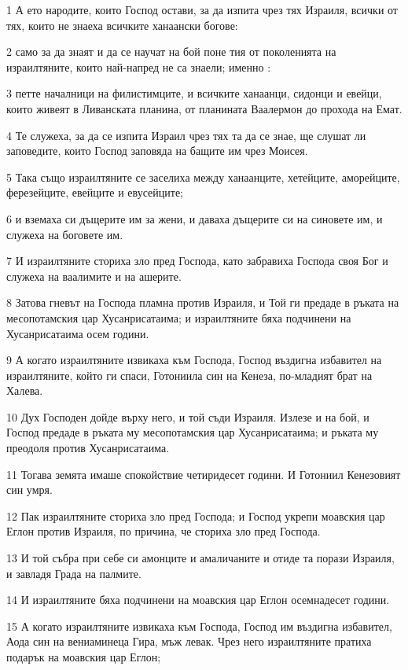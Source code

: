 \par 1 А ето народите, които Господ остави, за да изпита чрез тях Израиля, всички от тях, които не знаеха всичките ханаански богове:
\par 2 само за да знаят и да се научат на бой поне тия от поколенията на израилтяните, които най-напред не са знаели; именно :
\par 3 петте началници на филистимците, и всичките ханаанци, сидонци и евейци, които живеят в Ливанската планина, от планината Ваалермон до прохода на Емат.
\par 4 Те служеха, за да се изпита Израил чрез тях та да се знае, ще слушат ли заповедите, които Господ заповяда на бащите им чрез Моисея.
\par 5 Така също израилтяните се заселиха между ханаанците, хетейците, аморейците, ферезейците, евейците и евусейците;
\par 6 и вземаха си дъщерите им за жени, и даваха дъщерите си на синовете им, и служеха на боговете им.
\par 7 И израилтяните сториха зло пред Господа, като забравиха Господа своя Бог и служеха на ваалимите и на ашерите.
\par 8 Затова гневът на Господа пламна против Израиля, и Той ги предаде в ръката на месопотамския цар Хусанрисатаима; и израилтяните бяха подчинени на Хусанрисатаима осем години.
\par 9 А когато израилтяните извикаха към Господа, Господ въздигна избавител на израилтяните, който ги спаси, Готониила син на Кенеза, по-младият брат на Халева.
\par 10 Дух Господен дойде върху него, и той съди Израиля. Излезе и на бой, и Господ предаде в ръката му месопотамския цар Хусанрисатаима; и ръката му преодоля против Хусанрисатаима.
\par 11 Тогава земята имаше спокойствие четиридесет години. И Готониил Кенезовият син умря.
\par 12 Пак израилтяните сториха зло пред Господа; и Господ укрепи моавския цар Еглон против Израиля, по причина, че сториха зло пред Господа.
\par 13 И той събра при себе си амонците и амаличаните и отиде та порази Израиля, и завладя Града на палмите.
\par 14 И израилтяните бяха подчинени на моавския цар Еглон осемнадесет години.
\par 15 А когато израилтяните извикаха към Господа, Господ им въздигна избавител, Аода син на вениаминеца Гира, мъж левак. Чрез него израилтяните пратиха подарък на моавския цар Еглон;

